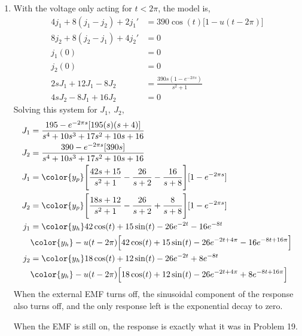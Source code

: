 \begin{enumerate}
    \item With the voltage only acting for $ t < 2\pi $, the model is,
          \begin{align}
              4j_1 + 8(j_1 - j_2) + 2j_1' & = 390 \cos(t) \Big[1 - u(t - 2\pi)\Big] \\
              8j_2 +8(j_2 - j_1) + 4j_2'  & = 0                                     \\
              j_1(0)                      & = 0                                     \\
              j_2(0)                      & = 0                                     \\
              2sJ_1 + 12J_1 - 8J_2        & = \frac{390s(1 - e^{-2\pi s})}{s^2 + 1} \\
              4sJ_2 - 8J_1 + 16J_2        & = 0
          \end{align}
          Solving this system for $ J_1,\ J_2 $,
          \begin{align}
              J_1 & = \frac{195 - e^{-2\pi s}[195(s)(s+4)]}
              {s^4 + 10s^3 + 17s^2 + 10s + 16}                                       \\
              J_2 & = \frac{390 - e^{-2\pi s}[390s]}{s^4 + 10s^3 + 17s^2 + 10s + 16} \\
              J_1 & = \color{y_p} \Bigg[\frac{42s + 15}{s^2 + 1}
              - \frac{26}{s+2} - \frac{16}{s + 8}\Bigg] [1 - e^{-2\pi s}]            \\
              J_2 & = \color{y_p} \Bigg[ \frac{18s + 12}{s^2 + 1}
              - \frac{26}{s+2} + \frac{8}{s + 8}\Bigg] [1 - e^{-2\pi s}]             \\
              j_1 & = \color{y_h} 42\cos(t) + 15\sin(t) - 26e^{-2t} - 16e^{-8t}      \\
                  & \color{y_h} - u(t - 2\pi) \Big[ 42\cos(t) + 15\sin(t)
              - 26e^{-2t + 4\pi} - 16e^{-8t + 16\pi} \Big]                          \\
              j_2 & = \color{y_h} 18\cos(t) + 12\sin(t) - 26e^{-2t} + 8e^{-8t}       \\
                  & \color{y_h} - u(t - 2\pi) \Big[ 18\cos(t) + 12\sin(t)
                  - 26e^{-2t + 4\pi} + 8e^{-8t + 16\pi} \Big]
          \end{align}
          When the external EMF turns off, the sinusoidal component of the response
          also turns off, and the only response left is the exponential decay to zero.
          \par When the EMF is still on, the response is exactly what it was in Problem
          19.
\end{enumerate}